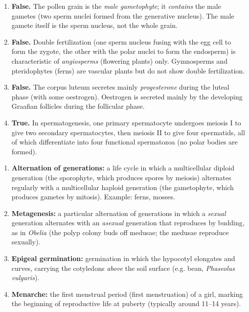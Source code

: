 \documentclass[11pt]{article}
\newcommand{\cle}[1]{{\popxbold\color{popdark}#1}}
\begin{document}
\begin{corrige}
\begin{enumerate}
\item \textbf{False.} The pollen grain is the \emph{male gametophyte}; it \emph{contains} the male gametes (two sperm nuclei formed from the generative nucleus). The male gamete itself is the sperm nucleus, not the whole grain.
\item \textbf{False.} Double fertilization (one sperm nucleus fusing with the egg cell to form the zygote, the other with the polar nuclei to form the endosperm) is characteristic of \emph{angiosperms} (flowering plants) only. Gymnosperms and pteridophytes (ferns) are vascular plants but do not show double fertilization.
\item \textbf{False.} The corpus luteum secretes mainly \emph{progesterone} during the luteal phase (with some oestrogen). Oestrogen is secreted mainly by the developing Graafian follicles during the follicular phase.
\item \textbf{True.} In spermatogenesis, one primary spermatocyte undergoes meiosis I to give two secondary spermatocytes, then meiosis II to give four spermatids, all of which differentiate into four functional spermatozoa (no polar bodies are formed).
\end{enumerate}
\end{corrige}

\begin{corrige}
\begin{enumerate}
\item \textbf{Alternation of generations:} a life cycle in which a multicellular \cle{diploid} generation (the \cle{sporophyte}, which produces spores by meiosis) alternates regularly with a multicellular \cle{haploid} generation (the \cle{gametophyte}, which produces gametes by mitosis). Example: ferns, mosses.
\item \textbf{Metagenesis:} a particular alternation of generations in which a \emph{sexual} generation alternates with an \emph{asexual} generation that reproduces by budding, as in \emph{Obelia} (the polyp colony buds off medusae; the medusae reproduce sexually).
\item \textbf{Epigeal germination:} germination in which the \cle{hypocotyl} elongates and curves, carrying the cotyledons \emph{above} the soil surface (e.g. bean, \emph{Phaseolus vulgaris}).
\item \textbf{Menarche:} the first menstrual period (first menstruation) of a girl, marking the beginning of reproductive life at puberty (typically around 11–14 years).
\end{enumerate}
\end{corrige}
\end{document}
